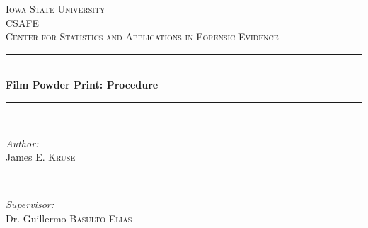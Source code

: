 \begin{titlepage}

\newcommand{\HRule}{\rule{\linewidth}{0.5mm}} %

\center %
 

\textsc{\LARGE Iowa State University}\\[1.5cm] %
\textsc{\Large CSAFE}\\[0.5cm] %
\textsc{\large Center for Statistics and Applications in Forensic Evidence }\\[0.5cm] %


\HRule \\[0.4cm]
{ \huge \bfseries Film Powder Print: Procedure  }\\[0.4cm] %
\HRule \\[1.5cm]
 

\begin{minipage}{0.4\textwidth}
\begin{flushleft} \large
\emph{Author:}\\
James \textsc{E. Kruse} %
\end{flushleft}
\end{minipage}
~
\begin{minipage}{0.4\textwidth}
\begin{flushright} \large
\emph{Supervisor:} \\
Dr. Guillermo \textsc{Basulto-Elias} %
\end{flushright}
\end{minipage}\\[2cm]


\end{titlepage}
